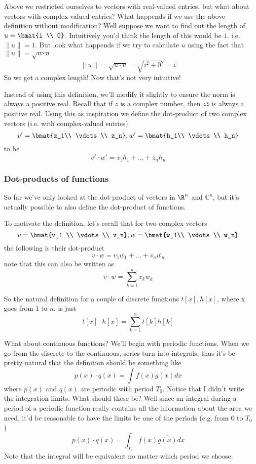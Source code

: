 \documentclass{article}
\newcommand{\0}{{\mathbf{0}}}
\begin{document}
Above we restricted ourselves to vectors with real-valued entries, but what about vectors with complex-valued entries?
What happends if we use the above definition without modification? Well suppose we want to find out
the length of $u=\bmat{i \\ 0}$. Intuitively you'd think the length of this would be $1$, i.e. $\| u \| = 1$.
But look what happends if we try to calculate $u$ using the fact that $\| u \| = \sqrt{u \cdot u}$
$$ \| u \| = \sqrt{u\cdot u} = \sqrt{i^2 + 0^2} = i $$
So we get a complex length! Now that's not very intuitive!

Instead of using this definition, we'll modify it slightly to ensure the norm is always a positive real.
Recall that if $z$ is a complex number, then $z\overline{z}$ is always a positive real. Using
this as inspiration we define the dot-product of two complex vectors (i.e. with complex-valued entries)
$$v' = \bmat{z_1\\ \vdots \\ z_n}, w' = \bmat{h_1\\ \vdots\\ h_n}$$
to be
$$ v' \cdot w' = z_1 \overline{h_1} + \dots + z_n \overline{h_n} $$

\subsubsection{Dot-products of functions}
So far we've only looked at the dot-product of vectors in $\R^n$ and $\mathbb{C}^n$,
but it's actually possible to also define the dot-product of functions.

To motivate the definition, let's recall that for two complex vectors
$$v=\bmat{v_1 \\ \vdots \\ v_n}, w=\bmat{w_1\\ \vdots \\ w_n}$$
the following is their dot-product
$$ v \cdot w = v_1 \overline{w_1} + \dots + v_n \overline{w_n} $$
note that this can also be written as
$$ v \cdot w = \sum^{n}_{k=1} v_{k}\overline{w_{k}} $$

So the natural definition for a couple of discrete functions $t[x], h[x]$,
where x goes from $1$ to $n$, is just
$$ t[x] \cdot h[x] = \sum^{n}_{k=1} t[k]\overline{h[k]} $$

What about continuous functions? We'll begin with periodic functions.
When we go from the discrete to the continuous, series
turn into integrals, thus it's be pretty natural that the definition should be something like
$$ p(x) \cdot q(x) = \int f(x)\overline{g(x)} dx $$
where $p(x)$ and $q(x)$ are periodic with period $T_0$. Notice that I didn't write the
integration limits. What should these be? Well since an integral during a period of a periodic function really contains
all the information about the area we need, it'd be reasonable to have the limits be one of the periods (e.g. from 0 to $T_0$)
$$ p(x) \cdot q(x) = \int_{T_0} f(x)\overline{g(x)} dx $$
Note that the integral will be equivalent no matter which period we choose.
\end{document}
